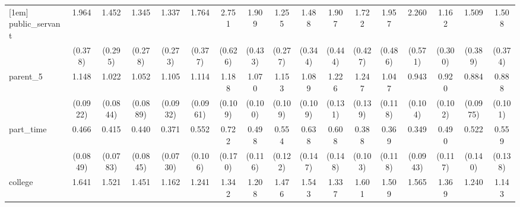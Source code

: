 {\begin{tabular}{l*{16}{c}}
[1em]
public\_servant      &       1.964\sym{***}&       1.452         &       1.345         &       1.337         &       1.764\sym{**} &       2.751\sym{***}&       1.909\sym{**} &       1.255         &       1.488         &       1.907\sym{**} &       1.722\sym{*}  &       1.957\sym{**} &       2.260\sym{**} &       1.162         &       1.509         &       1.508         \\
                    &     (0.378)         &     (0.295)         &     (0.278)         &     (0.273)         &     (0.377)         &     (0.626)         &     (0.433)         &     (0.277)         &     (0.344)         &     (0.444)         &     (0.427)         &     (0.486)         &     (0.571)         &     (0.300)         &     (0.389)         &     (0.374)         \\
[1em]
parent\_5            &       1.148         &       1.022         &       1.052         &       1.105         &       1.114         &       1.188         &       1.070         &       1.153         &       1.089         &       1.226         &       1.247\sym{*}  &       1.047         &       0.943         &       0.920         &       0.884         &       0.888         \\
                    &    (0.0922)         &    (0.0844)         &    (0.0889)         &    (0.0932)         &    (0.0961)         &     (0.109)         &     (0.100)         &     (0.109)         &     (0.109)         &     (0.131)         &     (0.139)         &     (0.118)         &     (0.104)         &     (0.102)         &    (0.0975)         &     (0.101)         \\
[1em]
part\_time           &       0.466\sym{***}&       0.415\sym{***}&       0.440\sym{***}&       0.371\sym{***}&       0.552\sym{**} &       0.722         &       0.498\sym{**} &       0.554\sym{**} &       0.638         &       0.608\sym{*}  &       0.388\sym{***}&       0.369\sym{**} &       0.349\sym{***}&       0.490\sym{**} &       0.522\sym{*}  &       0.559\sym{*}  \\
                    &    (0.0849)         &    (0.0783)         &    (0.0845)         &    (0.0730)         &     (0.106)         &     (0.170)         &     (0.116)         &     (0.122)         &     (0.147)         &     (0.148)         &     (0.103)         &     (0.118)         &    (0.0943)         &     (0.117)         &     (0.140)         &     (0.138)         \\
[1em]
college             &       1.641\sym{***}&       1.521\sym{***}&       1.451\sym{***}&       1.162         &       1.241         &       1.342\sym{*}  &       1.208         &       1.476\sym{**} &       1.543\sym{**} &       1.337\sym{*}  &       1.601\sym{**} &       1.509\sym{**} &       1.565\sym{**} &       1.369\sym{*}  &       1.240         &       1.143         \\

\end{tabular}}
